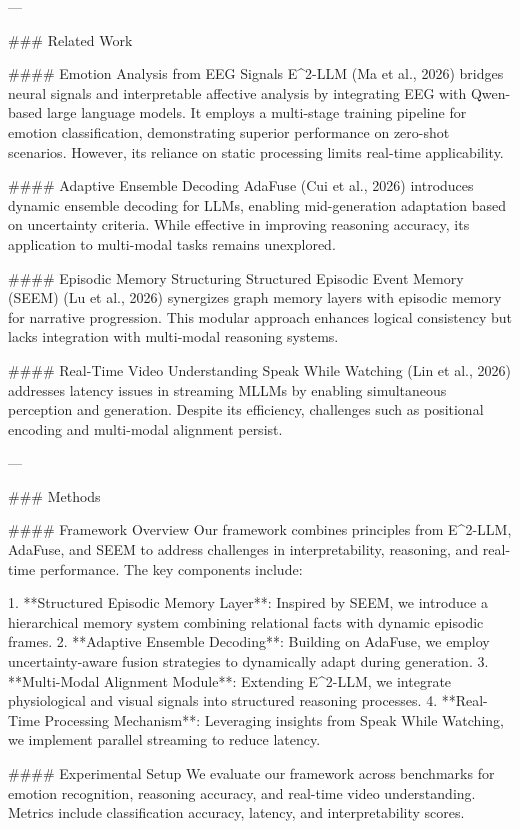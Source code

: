 ---

### Related Work  

#### Emotion Analysis from EEG Signals  
E^2-LLM (Ma et al., 2026) bridges neural signals and interpretable affective analysis by integrating EEG with Qwen-based large language models. It employs a multi-stage training pipeline for emotion classification, demonstrating superior performance on zero-shot scenarios. However, its reliance on static processing limits real-time applicability.

#### Adaptive Ensemble Decoding  
AdaFuse (Cui et al., 2026) introduces dynamic ensemble decoding for LLMs, enabling mid-generation adaptation based on uncertainty criteria. While effective in improving reasoning accuracy, its application to multi-modal tasks remains unexplored.

#### Episodic Memory Structuring  
Structured Episodic Event Memory (SEEM) (Lu et al., 2026) synergizes graph memory layers with episodic memory for narrative progression. This modular approach enhances logical consistency but lacks integration with multi-modal reasoning systems.

#### Real-Time Video Understanding  
Speak While Watching (Lin et al., 2026) addresses latency issues in streaming MLLMs by enabling simultaneous perception and generation. Despite its efficiency, challenges such as positional encoding and multi-modal alignment persist.

---

### Methods  

#### Framework Overview  
Our framework combines principles from E^2-LLM, AdaFuse, and SEEM to address challenges in interpretability, reasoning, and real-time performance. The key components include:  

1. **Structured Episodic Memory Layer**: Inspired by SEEM, we introduce a hierarchical memory system combining relational facts with dynamic episodic frames.  
2. **Adaptive Ensemble Decoding**: Building on AdaFuse, we employ uncertainty-aware fusion strategies to dynamically adapt during generation.  
3. **Multi-Modal Alignment Module**: Extending E^2-LLM, we integrate physiological and visual signals into structured reasoning processes.  
4. **Real-Time Processing Mechanism**: Leveraging insights from Speak While Watching, we implement parallel streaming to reduce latency.

#### Experimental Setup  
We evaluate our framework across benchmarks for emotion recognition, reasoning accuracy, and real-time video understanding. Metrics include classification accuracy, latency, and interpretability scores.

